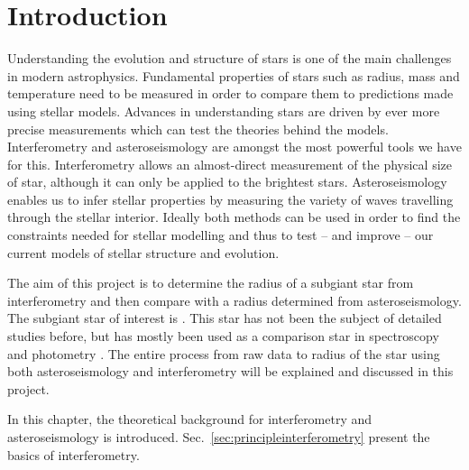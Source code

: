\chapter{Introduction}
Understanding the evolution and structure of stars is one of the main challenges in modern astrophysics. Fundamental properties of stars such as radius, mass and temperature need to be measured in order to compare them to predictions made using stellar models. 
Advances in understanding stars are driven by ever more precise measurements which can test the theories behind the models. Interferometry and asteroseismology are amongst the most powerful tools we have for this. Interferometry allows an almost-direct measurement of the physical size of star, although it can only be applied to the brightest stars. Asteroseismology enables us to infer stellar properties by measuring the variety of waves travelling through the stellar interior. 
Ideally both methods can be used in order to find the constraints needed for stellar modelling and thus to test -- and improve -- our current models of stellar structure and evolution.

The aim of this project is to determine the radius of a subgiant star from interferometry and then compare with a radius determined from asteroseismology. 
The subgiant star of interest is \mystar. This star has not been the subject of detailed studies before, but has mostly been used as a comparison star in spectroscopy and photometry \citep{schiller1988photometric,ferrero2004magnetic}.
The entire process from raw data to radius of the star using both asteroseismology and interferometry will be explained and discussed in this project.

In this chapter, the theoretical background for interferometry and asteroseismology is introduced. 
Sec.~\ref{sec:principleinterferometry} present the basics of interferometry.

\vspace{-5pt}
